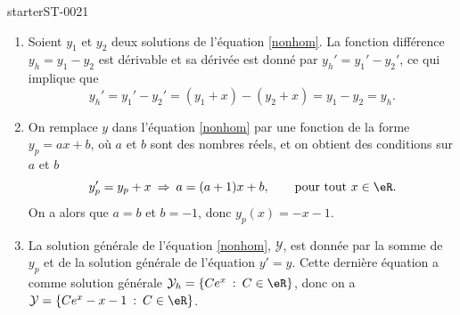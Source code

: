 
\begin{corrige}{starterST-0021}

  \begin{enumerate}
  \item Soient $y_1$ et $y_2$ deux solutions de l'équation \eqref{nonhom}. La fonction différence $y_h= y_1-y_2$ est dérivable et sa dérivée est donné par $y_h'= y_1'-y_2'$, ce qui implique que 
    \begin{equation*}
     y_h'= y_1'-y_2' = (y_1+x) -(y_2+x) = y_1-y_2  = y_h. 
    \end{equation*}
  \item On remplace $y$ dans l'équation \eqref{nonhom} par une fonction de la forme  $y_p = ax+b$, où $a$ et $b$ sont des nombres réels, et on obtient des conditions sur $a $ et $b$
    \begin{equation*}
      y_p'= y_p+x \:\Rightarrow \: a= (a+1)x+b  , \qquad\text{pour tout }x\in\eR.
    \end{equation*}
On a alors que $a=b$ et $b=-1$, donc $y_p(x) = -x-1$.
  \item La solution générale de l'équation \eqref{nonhom}, $\mathcal{Y}$, est donnée par la somme de $y_p$ et de la solution générale de l'équation $y' = y$. Cette dernière équation a comme solution générale $\mathcal{Y}_h = \left\{ Ce^x\: : \: C\in\eR\right\}$, donc on a $\mathcal{Y} = \left\{ Ce^x-x-1\: : \: C\in\eR\right\}$.
  \end{enumerate}

  

\end{corrige}
